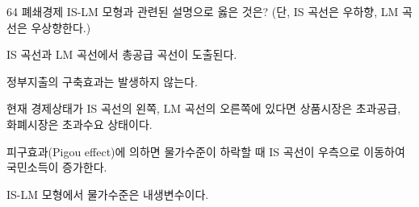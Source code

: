 \begin{question}{64}
폐쇄경제 IS-LM 모형과 관련된 설명으로 옳은 것은? (단, IS 곡선은 우하향, LM 곡선은 우상향한다.)
\begin{choices}
  \item IS 곡선과 LM 곡선에서 총공급 곡선이 도출된다.
  \item 정부지출의 구축효과는 발생하지 않는다.
  \item 현재 경제상태가 IS 곡선의 왼쪽, LM 곡선의 오른쪽에 있다면 상품시장은 초과공급, 화폐시장은 초과수요 상태이다.
  \item 피구효과(Pigou effect)에 의하면 물가수준이 하락할 때 IS 곡선이 우측으로 이동하여 국민소득이 증가한다.
  \item IS-LM 모형에서 물가수준은 내생변수이다.
\end{choices}
\end{question}
